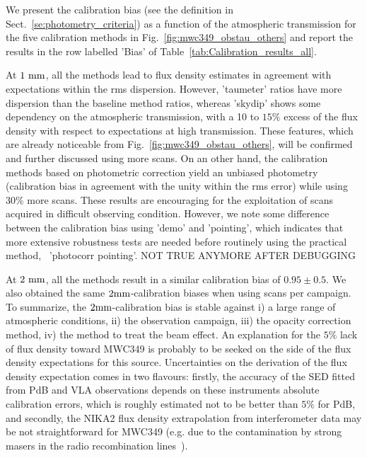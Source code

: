 We present the calibration bias (see the definition in
Sect.~\ref{se:photometry_criteria}) as a function of the atmospheric
transmission for the five calibration methods in
Fig.~\ref{fig:mwc349_obstau_others} and report the results in the row
labelled 'Bias' of Table~\ref{tab:Calibration_results_all}. 

At $1~\rm{mm}$, all the methods lead to flux density estimates in
agreement with expectations within the rms dispersion. However,
'taumeter' ratios have more dispersion than the baseline method
ratios, whereas 'skydip' shows some dependency on the atmospheric
transmission, with a 10 to $15\%$ excess of the flux density with
respect to expectations at high transmission. These features, which are
already noticeable from Fig.~\ref{fig:mwc349_obstau_others}, will be
confirmed and further discussed using more scans. On an other hand,
the calibration methods based on photometric correction yield an
unbiased photometry (calibration bias in agreement with the unity
within the rms error) while using $30\%$ more scans. These results are
encouraging for the exploitation of scans acquired in difficult
observing condition. {\color{magenta} However, we note some difference between the
calibration bias using 'demo' and 'pointing', which indicates that
more extensive robustness tests are needed before routinely using the
practical method, \aka\ 'photocorr pointing'. NOT TRUE ANYMORE AFTER DEBUGGING}   


At $2~\rm{mm}$, all the methods result in a similar calibration bias
of $0.95 \pm 0.5$. We also obtained the same $2\rm{mm}$-calibration
biases when using scans per campaign. To summarize, the
$2\rm{mm}$-calibration bias is stable against i) a large range of
atmospheric conditions, ii) the observation campaign, iii) the
opacity correction method, iv) the method to treat the beam
effect. An explanation for the $5\%$ lack of flux density toward
MWC349 is probably to be seeked on the side of the flux density
expectations for this source. Uncertainties on the
derivation of the flux density expectation comes in two flavours:
firstly, the accuracy of the SED fitted from PdB and VLA observations
depends on these instruments absolute calibration errors, which is
roughly estimated not to be better than $5\%$ for PdB, and secondly,
the NIKA2 flux density extrapolation from
interferometer data may be not straightforward for MWC349 (e.g. due to
the contamination by strong masers in the radio recombination lines~\cite{masingRRL}).

